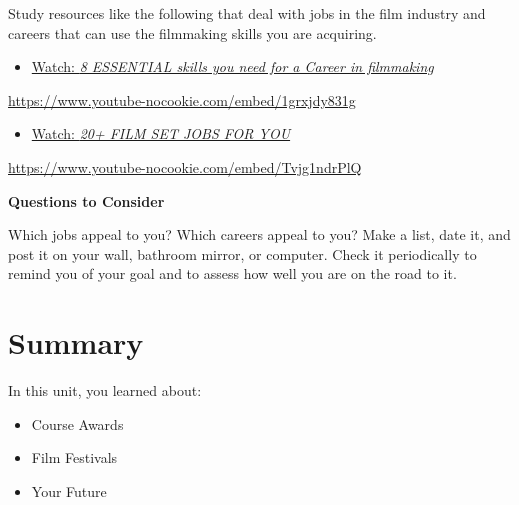 \documentclass[
  letterpaper,
  DIV=11,
  numbers=noendperiod]{scrreprt}
\providecommand{\tightlist}{%
  \setlength{\itemsep}{0pt}\setlength{\parskip}{0pt}}\usepackage{longtable,booktabs,array}
\begin{document}
\begin{tcolorbox}[enhanced jigsaw, titlerule=0mm, opacitybacktitle=0.6, left=2mm, title={Learning Activity}, coltitle=black, colbacktitle=quarto-callout-note-color!10!white, toptitle=1mm, bottomtitle=1mm, colframe=quarto-callout-note-color-frame, colback=white, arc=.35mm, rightrule=.15mm, bottomrule=.15mm, toprule=.15mm, opacityback=0, breakable, leftrule=.75mm]

Study resources like the following that deal with jobs in the film
industry and careers that can use the filmmaking skills you are
acquiring.

\begin{itemize}
\tightlist
\item
  \href{https://www.youtube.com/watch?v=1grxjdy831g}{Watch: \emph{8
  ESSENTIAL skills you need for a Career in filmmaking}}
\end{itemize}

\url{https://www.youtube-nocookie.com/embed/1grxjdy831g}

\begin{itemize}
\tightlist
\item
  \href{https://www.youtube.com/watch?v=Tvjg1ndrPlQ}{Watch: \emph{20+
  FILM SET JOBS FOR YOU}}
\end{itemize}

\url{https://www.youtube-nocookie.com/embed/Tvjg1ndrPlQ}

\textbf{Questions to Consider}

Which jobs appeal to you? Which careers appeal to you? Make a list, date
it, and post it on your wall, bathroom mirror, or computer. Check it
periodically to remind you of your goal and to assess how well you are
on the road to it.

\end{tcolorbox}

\section*{Summary}\label{summary-9}


In this unit, you learned about:

\begin{itemize}
\tightlist
\item
  Course Awards
\item
  Film Festivals
\item
  Your Future
\end{itemize}
\end{document}
